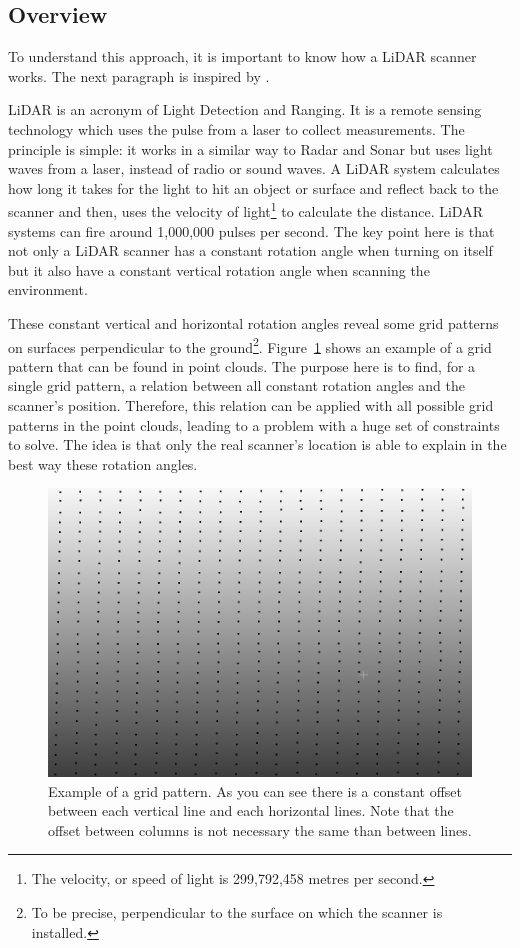 \subsection{Overview}
To understand this approach, it is important to know how a LiDAR scanner works. The next paragraph is inspired by \cite{lidar}.

LiDAR is an acronym of Light Detection and Ranging. It is a remote sensing technology which uses the pulse from a laser to collect measurements. The principle is simple: it works in a similar way to Radar and Sonar but uses light waves from a laser, instead of radio or sound waves. A LiDAR system calculates how long it takes for the light to hit an object or surface and reflect back to the scanner and then, uses the velocity of light\footnote{The velocity, or speed of light is 299,792,458 metres per second.} to calculate the distance. LiDAR systems can fire around 1,000,000 pulses per second. The key point here is that not only a LiDAR scanner has a constant rotation angle when turning on itself but it also have a constant vertical rotation angle when scanning the environment.

These constant vertical and horizontal rotation angles reveal some grid patterns on surfaces perpendicular to the ground\footnote{To be precise, perpendicular to the surface on which the scanner is installed.}. Figure~\ref{fig:grid1} shows an example of a grid pattern that can be found in point clouds. The purpose here is to find, for a single grid pattern, a relation between all constant rotation angles and the scanner's position. Therefore, this relation can be applied with all possible grid patterns in the point clouds, leading to a problem with a huge set of
constraints to solve. The idea is that only the real scanner's location is able to explain in the best way these rotation angles.

\begin{figure}[H]
  \centering
  \includegraphics[scale=0.5]{img/grid1.png}
  \caption{Example of a grid pattern. As you can see there is a constant offset between each vertical line and each horizontal lines. Note that the offset between columns is not necessary the same than between lines.}
  \label{fig:grid1}
\end{figure}

